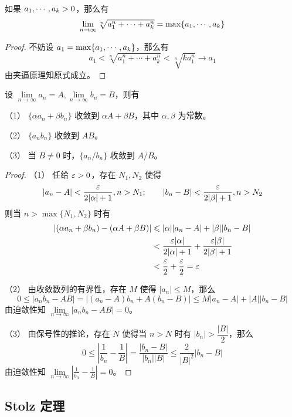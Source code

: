 \begin{example}
	如果 $a_1,\cdots,a_k > 0$，那么有
	\[ \lim_{n \to \infty} \sqrt[n]{a_1^n + \cdots + a_k^n} = \max\{a_1,\cdots,a_k\} \]
\end{example}

\begin{proof}
	不妨设 $a_1 = \max\{a_1,\cdots,a_k\}$，那么有
	\[ a_1 < \sqrt[n]{a_1^n + \cdots + a_k^n} < \sqrt[n]{k a_1^n} \to a_1 \]
	由夹逼原理知原式成立。
\end{proof}

\begin{theorem}[四则运算]
	设 $\lim\limits_{n\to \infty} a_n = A,\lim\limits_{n\to \infty} b_n = B$，则有

	（1） $\{\alpha a_n+\beta b_n\}$ 收敛到 $\alpha A+\beta B$，其中 $\alpha,\beta$ 为常数。

	（2） $\{a_nb_n\}$ 收敛到 $AB$。

	（3） 当 $B\ne 0$ 时，$\{a_n/b_n\}$ 收敛到 $A/B$。
\end{theorem}
\begin{proof}
	（1） 任给 $\varepsilon >0$，存在 $N_1,N_2$ 使得
	\[|a_n-A|<\frac{\varepsilon}{2|\alpha|+1},n>N_1;\qquad |b_n-B|<\frac{\varepsilon}{2|\beta|+1},n>N_2\]
	则当 $n>\max\{N_1,N_2\}$ 时有
	\[
		\begin{aligned}
			|(\alpha a_n+\beta b_n)-(\alpha A+\beta B)| & \leqslant |\alpha||a_n-A|+|\beta||b_n-B|                          \\
			                                            & < \frac{\varepsilon|\alpha|}{2|\alpha|+1}+\frac{\varepsilon|\beta|}{2|\beta|+1} \\
			                                            & < \frac{\varepsilon}2+\frac{\varepsilon}2=\varepsilon
		\end{aligned}
	\]

	（2） 由收敛数列的有界性，存在 $M$ 使得 $|a_n|\leqslant M$，那么
	\[0\leqslant |a_nb_n-AB|=|(a_n-A)b_n+A(b_n-B)|\leqslant M|a_n-A|+|A||b_n-B|\]
	由迫敛性知 $\lim\limits_{n\to \infty}|a_nb_n-AB| =0$。

	（3） 由保号性的推论，存在 $N$ 使得当 $n>N$ 时有 $|b_n|>\dfrac{|B|}{2}$，那么
	\[0 \leqslant \left|\frac{1}{b_n}-\frac{1}{B}\right| = \frac{|b_n-B|}{|b_n||B|} \leqslant \frac{2}{|B|^2}{|b_n-B|}\]
	由迫敛性知 $\lim\limits_{n\to \infty}\left|\frac{1}{b_n}-\frac{1}{B}\right| =0$。
\end{proof}

\subsection{Stolz 定理}

